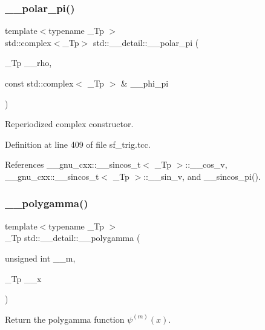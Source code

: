 \subsubsection{\texorpdfstring{\+\_\+\+\_\+polar\+\_\+pi()}{\_\_polar\_pi()}\hspace{0.1cm}{\footnotesize\ttfamily [2/2]}}
{\footnotesize\ttfamily template$<$typename \+\_\+\+Tp $>$ \\
std\+::complex$<$\+\_\+\+Tp$>$ std\+::\+\_\+\+\_\+detail\+::\+\_\+\+\_\+polar\+\_\+pi (\begin{DoxyParamCaption}\item[{\+\_\+\+Tp}]{\+\_\+\+\_\+rho,  }\item[{const std\+::complex$<$ \+\_\+\+Tp $>$ \&}]{\+\_\+\+\_\+phi\+\_\+pi }\end{DoxyParamCaption})\hspace{0.3cm}{\ttfamily [inline]}}

Reperiodized complex constructor. 

Definition at line 409 of file sf\+\_\+trig.\+tcc.



References \+\_\+\+\_\+gnu\+\_\+cxx\+::\+\_\+\+\_\+sincos\+\_\+t$<$ \+\_\+\+Tp $>$\+::\+\_\+\+\_\+cos\+\_\+v, \+\_\+\+\_\+gnu\+\_\+cxx\+::\+\_\+\+\_\+sincos\+\_\+t$<$ \+\_\+\+Tp $>$\+::\+\_\+\+\_\+sin\+\_\+v, and \+\_\+\+\_\+sincos\+\_\+pi().

\mbox{\label{namespacestd_1_1____detail_a25cc1b7c8adbc3b0fc8d4487ab23571c}} 
\subsubsection{\texorpdfstring{\+\_\+\+\_\+polygamma()}{\_\_polygamma()}}
{\footnotesize\ttfamily template$<$typename \+\_\+\+Tp $>$ \\
\+\_\+\+Tp std\+::\+\_\+\+\_\+detail\+::\+\_\+\+\_\+polygamma (\begin{DoxyParamCaption}\item[{unsigned int}]{\+\_\+\+\_\+m,  }\item[{\+\_\+\+Tp}]{\+\_\+\+\_\+x }\end{DoxyParamCaption})}



Return the polygamma function $ \psi^{(m)}(x) $. 

